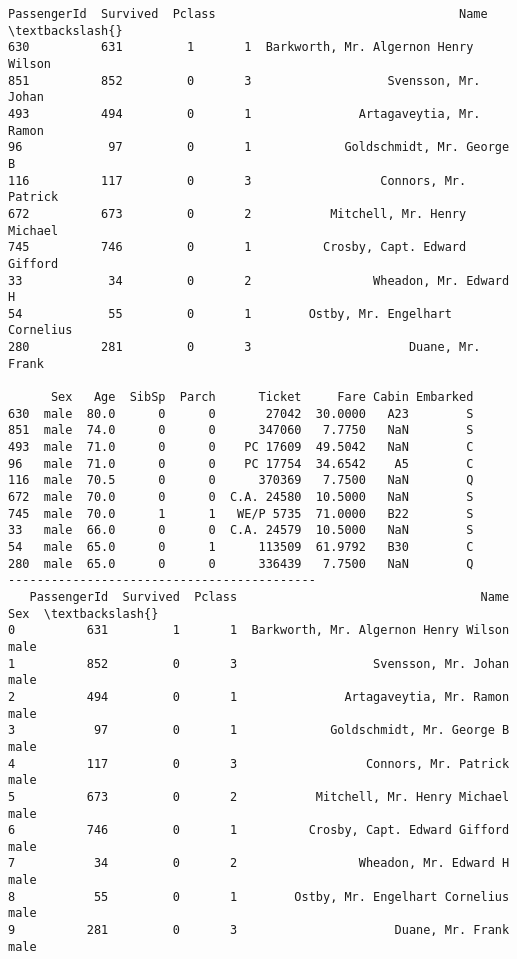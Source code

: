 \documentclass[11pt]{article}
\begin{document}
    \begin{Verbatim}[commandchars=\\\{\}]
     PassengerId  Survived  Pclass                                  Name  \textbackslash{}
630          631         1       1  Barkworth, Mr. Algernon Henry Wilson   
851          852         0       3                   Svensson, Mr. Johan   
493          494         0       1               Artagaveytia, Mr. Ramon   
96            97         0       1             Goldschmidt, Mr. George B   
116          117         0       3                  Connors, Mr. Patrick   
672          673         0       2           Mitchell, Mr. Henry Michael   
745          746         0       1          Crosby, Capt. Edward Gifford   
33            34         0       2                 Wheadon, Mr. Edward H   
54            55         0       1        Ostby, Mr. Engelhart Cornelius   
280          281         0       3                      Duane, Mr. Frank   

      Sex   Age  SibSp  Parch      Ticket     Fare Cabin Embarked  
630  male  80.0      0      0       27042  30.0000   A23        S  
851  male  74.0      0      0      347060   7.7750   NaN        S  
493  male  71.0      0      0    PC 17609  49.5042   NaN        C  
96   male  71.0      0      0    PC 17754  34.6542    A5        C  
116  male  70.5      0      0      370369   7.7500   NaN        Q  
672  male  70.0      0      0  C.A. 24580  10.5000   NaN        S  
745  male  70.0      1      1   WE/P 5735  71.0000   B22        S  
33   male  66.0      0      0  C.A. 24579  10.5000   NaN        S  
54   male  65.0      0      1      113509  61.9792   B30        C  
280  male  65.0      0      0      336439   7.7500   NaN        Q  
-------------------------------------------
   PassengerId  Survived  Pclass                                  Name   Sex  \textbackslash{}
0          631         1       1  Barkworth, Mr. Algernon Henry Wilson  male   
1          852         0       3                   Svensson, Mr. Johan  male   
2          494         0       1               Artagaveytia, Mr. Ramon  male   
3           97         0       1             Goldschmidt, Mr. George B  male   
4          117         0       3                  Connors, Mr. Patrick  male   
5          673         0       2           Mitchell, Mr. Henry Michael  male   
6          746         0       1          Crosby, Capt. Edward Gifford  male   
7           34         0       2                 Wheadon, Mr. Edward H  male   
8           55         0       1        Ostby, Mr. Engelhart Cornelius  male   
9          281         0       3                      Duane, Mr. Frank  male   


\end{Verbatim}
\end{document}
